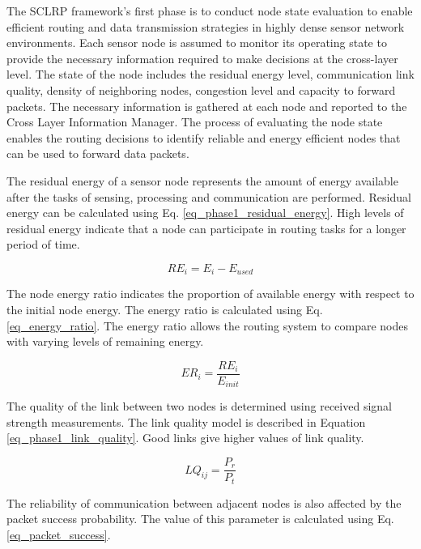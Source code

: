 \documentclass[a4paper,fleqn]{cas-dc}
\numberwithin{equation}{section}
\begin{document}
The SCLRP framework's first phase is to conduct node state evaluation to enable efficient routing and data transmission strategies in highly dense sensor network environments. Each sensor node is assumed to monitor its operating state to provide the necessary information required to make decisions at the cross-layer level. The state of the node includes the residual energy level, communication link quality, density of neighboring nodes, congestion level and capacity to forward packets. The necessary information is gathered at each node and reported to the Cross Layer Information Manager. The process of evaluating the node state enables the routing decisions to identify reliable and energy efficient nodes that can be used to forward data packets.

The residual energy of a sensor node represents the amount of energy available after the tasks of sensing, processing and communication are performed. Residual energy can be calculated using Eq. \ref{eq_phase1_residual_energy}. High levels of residual energy indicate that a node can participate in routing tasks for a longer period of time.

\begin{equation}
RE_i = E_i - E_{used}
\label{eq_phase1_residual_energy}
\end{equation}

The node energy ratio indicates the proportion of available energy with respect to the initial node energy. The energy ratio is calculated using Eq. \ref{eq_energy_ratio}. The energy ratio allows the routing system to compare nodes with varying levels of remaining energy.

\begin{equation}
ER_i = \frac{RE_i}{E_{init}}
\label{eq_energy_ratio}
\end{equation}

The quality of the link between two nodes is determined using received signal strength measurements. The link quality model is described in Equation \ref{eq_phase1_link_quality}. Good links give higher values of link quality.

\begin{equation}
LQ_{ij} = \frac{P_r}{P_t}
\label{eq_phase1_link_quality}
\end{equation}

The reliability of communication between adjacent nodes is also affected by the packet success probability. The value of this parameter is calculated using Eq. \ref{eq_packet_success}.
\end{document}
